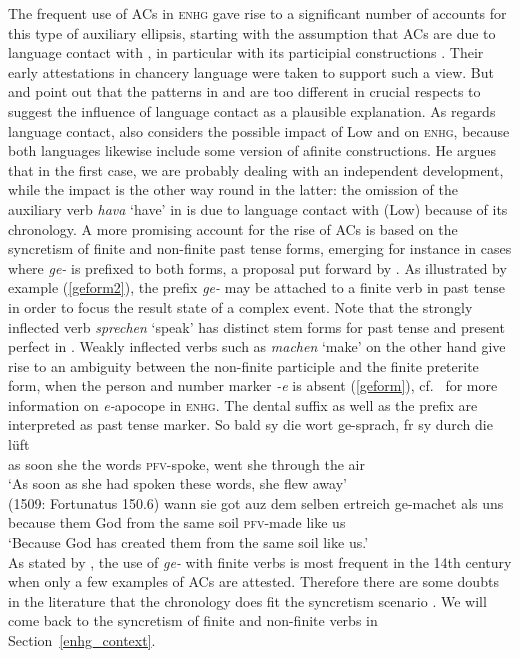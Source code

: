 \documentclass[output=paper,colorlinks,citecolor=brown]{langscibook}
\begin{document}
\largerpage
The frequent use of ACs in \textsc{enhg} gave rise to a significant number of accounts for this type of auxiliary ellipsis, starting with the assumption that ACs are due to language contact with , in particular with its participial constructions \citep{biener25}. Their early attestations in chancery language were taken to support such a view. But \citet[491]{behaghel28} and \citet{breitbarth2005} point out that the patterns in  and  are too different in crucial respects to suggest the influence of language contact as a plausible explanation. As regards language contact, \citet{blum2018} also considers the possible impact of Low  and  on \textsc{enhg}, because both languages likewise include some version of afinite constructions. He argues that in the first case, we are probably dealing with an independent development, while the impact is the other way round in the latter: the omission of the auxiliary verb \textit{hava} ‘have' in  is due to language contact with (Low)  because of its chronology. A more promising account for the rise of ACs is based on the syncretism of finite and non-finite past tense forms, emerging for instance in cases where \textit{ge-} is prefixed to both forms, a proposal put forward by \citet{biener25}. As illustrated by example (\ref{geform2}), the prefix \textit{ge-} may be attached to a finite verb in past tense in order to focus the result state of a complex event. Note that the strongly inflected verb \textit{sprechen} `speak' has distinct stem forms for past tense and present perfect in . Weakly inflected verbs such as \textit{machen} `make' on the other hand give rise to an ambiguity between the non-finite participle and the finite preterite form, when the person and number marker \textit{-e} is absent (\ref{geform}), cf.\ \citet[242]{ERSW93} for more information on \textit{e-}apocope in \textsc{enhg}. The dental suffix as well as the prefix are interpreted as past tense marker. 
\eal
\ex \label{geform2}
\gll So bald sy die wort ge-sprach, f\oldue{}r sy durch die lüft \\ as soon she the words \textsc{pfv}-spoke, went she through the air \\ 
\glt `As soon as she had spoken these words, she flew away' \\ \hfill (1509: Fortunatus 150.6)
\ex \label{geform}
\gll wann sie got auz dem selben ertreich ge-machet als uns \\ because them God from the same soil \textsc{pfv}-made like us \\ 
\glt `Because God has created them from the same soil like us.' \\   \hfill  \citep[386]{ERSW93}
\zl
As stated by \citet[386]{ERSW93}, the use of \textit{ge-} with finite verbs is most frequent in the 14th century when only a few examples of ACs are attested. Therefore there are some doubts in the literature that the chronology does fit the syncretism scenario \citep{ERSW93,breitbarth2005}. We will come back to the syncretism of finite and non-finite verbs in Section~\ref{enhg_context}. 
\end{document}
